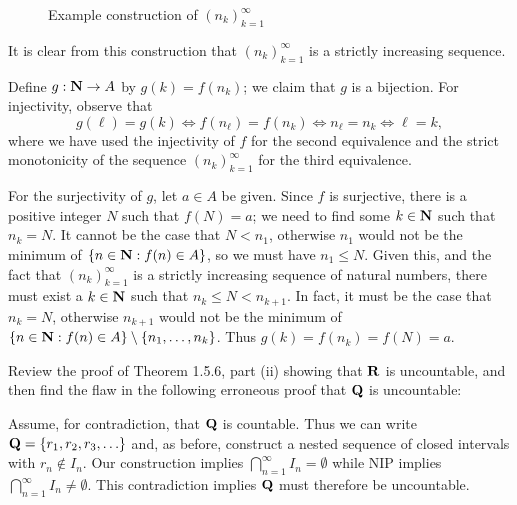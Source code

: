 \documentclass{lew98_solutions}
\begin{document}
\begin{solution}
\begin{figure}[h]
        \caption{Example construction of \( (n_k)_{k=1}^{\infty} \)}
        \label{fig:ex1.5.1}
    \end{figure}

    \noindent It is clear from this construction that \( (n_k)_{k=1}^{\infty} \) is a strictly increasing sequence.
    
    Define \( g : \mathbf{N} \to A \) by \( g(k) = f(n_k) \); we claim that \( g \) is a bijection. For injectivity, observe that
    \[
        g(\ell) = g(k) \iff f(n_{\ell}) = f(n_k) \iff n_{\ell} = n_k \iff \ell = k,
    \]
    where we have used the injectivity of \( f \) for the second equivalence and the strict monotonicity of the sequence \( (n_k)_{k=1}^{\infty} \) for the third equivalence.

    For the surjectivity of \( g \), let \( a \in A \) be given. Since \( f \) is surjective, there is a positive integer \( N \) such that \( f(N) = a \); we need to find some \( k \in \mathbf{N} \) such that \( n_k = N \). It cannot be the case that \( N < n_1 \), otherwise \( n_1 \) would not be the minimum of \( \{ n \in \mathbf{N} : f(n) \in A \} \), so we must have \( n_1 \leq N \). Given this, and the fact that \( (n_k)_{k=1}^{\infty} \) is a strictly increasing sequence of natural numbers, there must exist a \( k \in \mathbf{N} \) such that \( n_k \leq N < n_{k + 1} \). In fact, it must be the case that \( n_k = N \), otherwise \( n_{k + 1 } \) would not be the minimum of \( \{ n \in \mathbf{N} : f(n) \in A \} \setminus \{ n_1, \ldots, n_k \} \). Thus \( g(k) = f(n_k) = f(N) = a \).
\end{solution}

\begin{exercise}
\label{ex:1.5.2}
    Review the proof of Theorem 1.5.6, part (ii) showing that \( \mathbf{R} \) is uncountable, and then find the flaw in the following erroneous proof that \( \mathbf{Q} \) is uncountable:

    Assume, for contradiction, that \( \mathbf{Q} \) is countable. Thus we can write \( \mathbf{Q} = \{ r_1, r_2, r_3, \ldots \} \) and, as before, construct a nested sequence of closed intervals with \( r_n \not\in I_n \). Our construction implies \( \bigcap_{n=1}^{\infty} I_n = \emptyset \) while NIP implies \( \bigcap_{n=1}^{\infty} I_n \neq \emptyset \). This contradiction implies \( \mathbf{Q} \) must therefore be uncountable.
\end{exercise}
\end{document}

